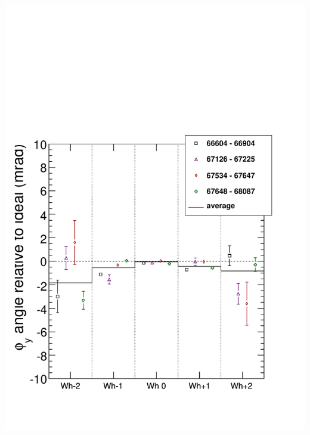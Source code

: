 \documentclass[compress]{beamer}
\begin{document}
\begin{frame}
{\begin{columns}
\includegraphics[width=\linewidth]{bydataset_HIPSC_phiy.pdf}
\end{columns}}
\end{frame}
\end{document}
